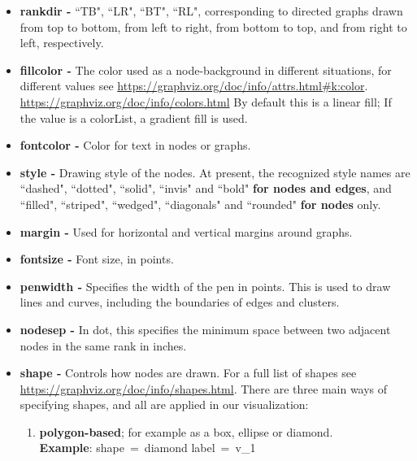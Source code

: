 \documentclass[a4paper, 12pt, bibliography=totoc]{scrartcl}
\begin{document}
\begin{itemize}
	\item \textbf{rankdir -} ``TB", ``LR", ``BT", ``RL", corresponding to directed graphs drawn from top to bottom, from left to right, from bottom to top, and from right to left, respectively.
	
	\item \textbf{fillcolor -} The color used as a node-background in different situations, for different values see \url{https://graphviz.org/doc/info/attrs.html#k:color}. \url{https://graphviz.org/doc/info/colors.html} 
	By default this is a linear fill; If the value is a colorList, a gradient fill is used. 
	
	\item \textbf{fontcolor -} Color for text in nodes or graphs. 
	
	\item \textbf{style -} Drawing style of the nodes.
	At present, the recognized style names are ``dashed", ``dotted", ``solid", ``invis" and ``bold" \textbf{for nodes and edges},  and ``filled", ``striped", ``wedged", ``diagonals" and ``rounded" \textbf{for nodes} only.
	
	\item 
	\textbf{margin -} Used for horizontal and vertical margins around graphs.
	
	\item \textbf{fontsize -} Font size, in points. 
	
	\item \textbf{penwidth -} Specifies the width of the pen in points. This is used to draw lines and curves, including the boundaries of edges and clusters. 
	
	\item \textbf{nodesep -} In dot, this specifies the minimum space between two adjacent nodes in the same rank in inches. 
	
	\item \textbf{shape -} Controls how nodes are drawn. For a full list of shapes see \url{https://graphviz.org/doc/info/shapes.html}. There are three main ways of specifying shapes, and all are applied in our visualization: 
	\begin{enumerate}[label=(\arabic*)]
		\item \textbf{polygon-based}; for example as a box, ellipse or diamond.\vspace{10pt}\\		
		\textbf{Example}: shape~=~diamond label~=~v\_1
		

\end{enumerate}
\end{itemize}
\end{document}
